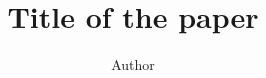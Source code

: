 \documentclass[11pt]{article}
\title{Title of the paper}
\author{Author}
\begin{document}
\maketitle

\begin{abstract}
\end{abstract}



\end{document}
